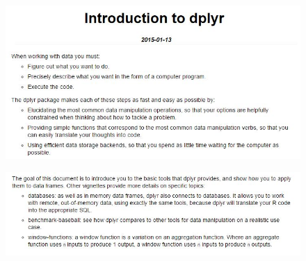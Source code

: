 \documentclass{beamer}
\begin{document}
\begin{frame}
	\begin{figure}
		\centering
		\includegraphics[width=1.15\linewidth]{tenpack01}
		
	\end{figure}
	
\end{frame}
\begin{frame}
	\begin{figure}
		\centering
		\includegraphics[width=1.15\linewidth]{tenpack02}
		
	\end{figure}
	
\end{frame}
\end{document}
